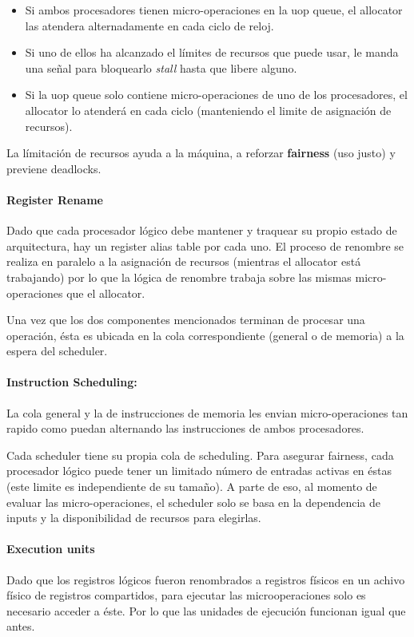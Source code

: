 \begin{itemize}
	\item Si ambos procesadores tienen micro-operaciones en la uop queue, el allocator las atendera alternadamente en cada ciclo de reloj.
	\item Si uno de ellos ha alcanzado el límites de recursos que puede usar, le manda una señal para bloquearlo \textit{stall} hasta que libere alguno.
	\item Si la uop queue solo contiene micro-operaciones de uno de los procesadores, el allocator lo atenderá en cada ciclo (manteniendo el limite de asignación de recursos).
\end{itemize}
 
 La límitación de recursos ayuda a la máquina, a reforzar \textbf{fairness} (uso justo) y previene deadlocks. 
 
\paragraph{Register Rename}
Dado que cada procesador lógico debe mantener y traquear su propio estado de arquitectura, hay un register alias table por cada uno. El proceso de renombre se realiza en paralelo a la asignación de recursos (mientras el allocator está trabajando) por lo que la lógica de renombre trabaja sobre las mismas micro-operaciones que el allocator.

Una vez que los dos componentes mencionados terminan de procesar una operación, ésta es ubicada en la cola correspondiente (general o de memoria) a la espera del scheduler.

\paragraph{Instruction Scheduling:} 
La cola general y la de instrucciones de memoria les envian micro-operaciones tan rapido como puedan alternando las instrucciones de ambos procesadores.

Cada scheduler tiene su propia cola de scheduling. Para  asegurar fairness, cada procesador lógico puede tener un limitado número de entradas activas en éstas (este limite es independiente de su tamaño). A parte de eso, al momento de evaluar las micro-operaciones, el scheduler solo se basa en la dependencia de inputs y la disponibilidad de recursos para elegirlas.

\paragraph{Execution units}
Dado que los registros lógicos fueron renombrados a registros físicos en un achivo físico de registros compartidos, para ejecutar las microoperaciones solo es necesario acceder a éste. Por lo que las unidades de ejecución funcionan igual que antes.

